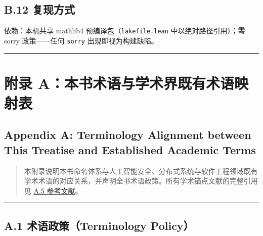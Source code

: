\subsection{B.12 复现方式}\label{b.12-ux590dux73b0ux65b9ux5f0f}

\begin{Shaded}
\begin{Highlighting}[]
\OperatorTok{/}
\OperatorTok{/}\OperatorTok{/}   
\end{Highlighting}
\end{Shaded}

依赖：本机共享 mathlib4 预编译包（\texttt{lakefile.lean}
中以绝对路径引用）；零 sorry 政策------任何 \texttt{sorry}
出现即视为构建缺陷。

\begin{center}\rule{0.5\linewidth}{0.5pt}\end{center}

\section{附录
A：本书术语与学术界既有术语映射表}\label{ux9644ux5f55-aux672cux4e66ux672fux8bedux4e0eux5b66ux672fux754cux65e2ux6709ux672fux8bedux6620ux5c04ux8868}

\subsection{Appendix A: Terminology Alignment between This Treatise and
Established Academic
Terms}\label{appendix-a-terminology-alignment-between-this-treatise-and-established-academic-terms}

\begin{quote}
本附录说明本书命名体系与人工智能安全、分布式系统与软件工程领域既有学术术语的对应关系，并声明全书术语政策。所有学术锚点文献的完整引用见
\hyperref[a5-ux53c2ux8003ux6587ux732e-references]{A.5 参考文献}。
\end{quote}

\begin{center}\rule{0.5\linewidth}{0.5pt}\end{center}

\subsection{A.1 术语政策（Terminology
Policy）}\label{a.1-ux672fux8bedux653fux7b56terminology-policy}

